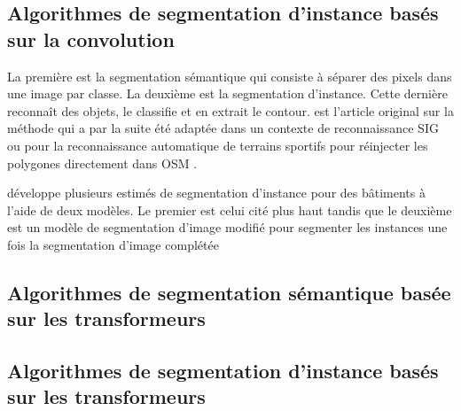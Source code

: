   \subsection{Algorithmes de segmentation d'instance basés sur la convolution}
  La première est la segmentation sémantique qui consiste à séparer des pixels dans une image par classe. La deuxième est la segmentation d'instance. Cette dernière reconnaît des objets, le classifie et en extrait le contour. \textcite{he_mask_2018} est l'article original sur la méthode qui a par la suite été adaptée dans un contexte de reconnaissance SIG \parencite{pesek_mask_2018} ou pour la reconnaissance automatique de terrains sportifs pour réinjecter les polygones directement dans \ac{OSM} \parencite{remillard_jremillardimages--osm_2024}.\par
  \textcite{fritz_instance_2020} développe plusieurs estimés de segmentation d'instance pour des bâtiments à l'aide de deux modèles. Le premier est celui cité plus haut\parencite{he_mask_2018} tandis que le deuxième est un modèle de segmentation d'image modifié pour segmenter les instances \parencite{iglovikov_ternausnetv2_2018} une fois la segmentation d'image complétée
  \subsection{Algorithmes de segmentation sémantique basée sur les transformeurs}
  \subsection{Algorithmes de segmentation d'instance basés sur les transformeurs}
